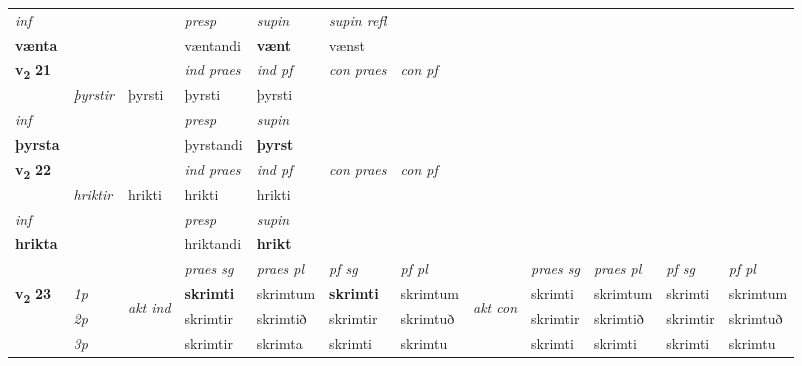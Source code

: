 \begin{longtable}[l]{X>{\footnotesize\itshape}llXXXXlXXXX}
\cmidrule{4-7}
   {\textit{inf}} & &     & \textit{presp} & \textit{supin} & \textit{supin refl}  \\*
  {\textbf{vænta}} & &     & væntandi &  \textbf{vænt} & vænst  \\*

\midrule

\multirow{2}{*}{{{\textbf{v{\textsubscript{2}}} \Large{\textbf{21}}}}}  &&&  \textit{ind praes} & \textit{ind pf} & \textit{con praes} & \textit{con pf} \\*
\multicolumn{3}{r}{\textit{e-n}} & þyrstir & þyrsti & þyrsti & þyrsti \\*

\cmidrule{4-7}
   {\textit{inf}} & &     & \textit{presp} & \textit{supin}   \\*
  {\textbf{þyrsta}} & &     & þyrstandi &  \textbf{þyrst}   \\*

\midrule

\multirow{2}{*}{{{\textbf{v{\textsubscript{2}}} \Large{\textbf{22}}}}}  &&&  \textit{ind praes} & \textit{ind pf} & \textit{con praes} & \textit{con pf} \\*
\multicolumn{3}{r}{\textit{það}} & hriktir & hrikti & hrikti & hrikti \\*

\cmidrule{4-7}
   {\textit{inf}} & &     & \textit{presp} & \textit{supin}   \\*
  {\textbf{hrikta}} & &     & hriktandi &  \textbf{hrikt}   \\*

\midrule

 & &   & \textit{praes sg}  & \textit{praes pl}    & \textit{ pf sg} & \textit{pf pl} & & \textit{praes sg}  & \textit{praes pl}    & \textit{pf sg} & \textit{pf pl }  \\ \cmidrule{4-7} \cmidrule{9-12}
 \multirow{2}{*}{{{\textbf{v{\textsubscript{2}}} \Large{\textbf{23}}}}}  & 1p & \multirow{3}{*}{\begin{turn}{90}\textit{akt ind}\end{turn}} & \textbf{skrimti} & skrimtum & \textbf{skrimti} & skrimtum & \multirow{3}{*}{\begin{turn}{90}\textit{akt con}\end{turn}} &skrimti & skrimtum & skrimti & skrimtum\\*
 & 2p &  &  skrimtir  & skrimtið & skrimtir & skrimtuð & & skrimtir & skrimtið & skrimtir & skrimtuð \\*
 & 3p &  & skrimtir & skrimta & skrimti & skrimtu & & skrimti & skrimti& skrimti & skrimtu \\*
\cmidrule{4-7} \cmidrule{9-12}


\end{longtable}
